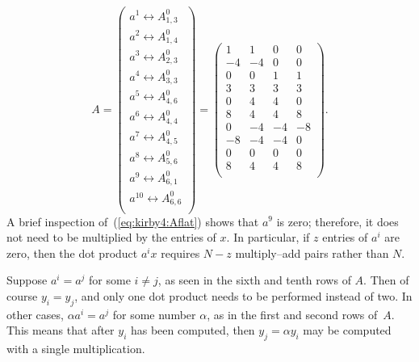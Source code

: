 \begin{equation} \label{eq:kirby4:Aflat}
A =
\left(
\begin{array}{c}
  a^1 \leftrightarrow A^0_{1,3} \\
  a^2 \leftrightarrow A^0_{1,4} \\
  a^3 \leftrightarrow A^0_{2,3} \\
  a^4 \leftrightarrow A^0_{3,3} \\
  a^5 \leftrightarrow A^0_{4,6} \\
  a^6 \leftrightarrow A^0_{4,4} \\
  a^7 \leftrightarrow A^0_{4,5} \\
  a^8 \leftrightarrow A^0_{5,6} \\
  a^9 \leftrightarrow A^0_{6,1} \\
  a^{10} \leftrightarrow A^0_{6,6} \\
\end{array}
\right)
 =
\left(
\begin{array}{cccc}
1 & 1 & 0 & 0 \\
-4 & -4 & 0 & 0 \\
0 & 0 & 1 & 1 \\
3 & 3 & 3 & 3 \\
0 & 4 & 4 & 0 \\
8 & 4 & 4 & 8 \\
0 & -4 & -4 & -8 \\
-8 & -4 & -4 & 0 \\
 0 & 0 & 0 & 0 \\
8 & 4 & 4 & 8 \\
\end{array}
\right).
\end{equation}
%
A brief inspection of~(\ref{eq:kirby4:Aflat}) shows that \( a^9 \) is
zero; therefore, it does not need to be multiplied by the entries
of \( x \). In particular, if \( z \) entries of \( a^i \) are zero,
then the dot product \( a^i x \) requires \( N - z \) multiply--add
pairs rather than \( N \).

Suppose \( a^i = a^j \) for some \( i \neq j \), as seen in the sixth
and tenth rows of \( A \).  Then of course \( y_i = y_j
\), and only one dot product needs to be performed instead of two. In
other cases, \( \alpha a^i = a^j \) for some number \( \alpha \), as
in the first and second rows of~$A$. This means that after \( y_i \)
has been computed, then \( y_j = \alpha y_i \) may be computed with a
single multiplication.


